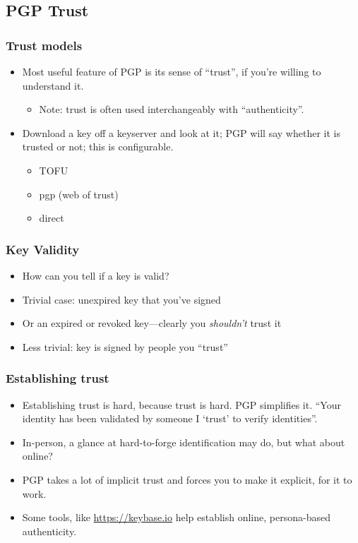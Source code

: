 \documentclass[aspectratio=1610,bigger,utf8]{beamer}
\begin{document}
\subsection{PGP Trust}
\begin{frame}
	\frametitle{Trust models}
	\begin{itemize}
		\item Most useful feature of PGP is its sense of ``trust'', if
			you're willing to understand it.
			\begin{itemize}
				\item \alert{Note:} trust is often used
					interchangeably with ``authenticity''.
			\end{itemize}
		\item Download a key off a keyserver and look at it; PGP will
			say whether it is trusted or not; this is configurable.
			\begin{itemize}
				\item TOFU
				\item pgp (web of trust)
				\item direct
			\end{itemize}
	\end{itemize}
\end{frame}
\begin{frame}
	\frametitle{Key Validity}
	\begin{itemize}
		\item How can you tell if a key is valid?\pause
		\item Trivial case: unexpired key that you've signed
		\item Or an expired or revoked key---clearly you \emph{shouldn't} trust it\pause
		\item Less trivial: key is signed by people you ``trust''
	\end{itemize}
\end{frame}
\begin{frame}
	\frametitle{Establishing trust}
	\begin{itemize}
		\item Establishing trust is hard, because \alert{trust is
			hard}. PGP simplifies it. ``Your identity has been
			validated by someone I `trust' to verify identities''.
		\item In-person, a glance at hard-to-forge identification may
			do, but what about online?
		\item PGP takes a lot of implicit trust and forces you to make
			it explicit, for it to work.
		\item Some tools, like \url{https://keybase.io} help establish online,
			\alert{persona-based authenticity}.
	\end{itemize}
\end{frame}
\end{document}
